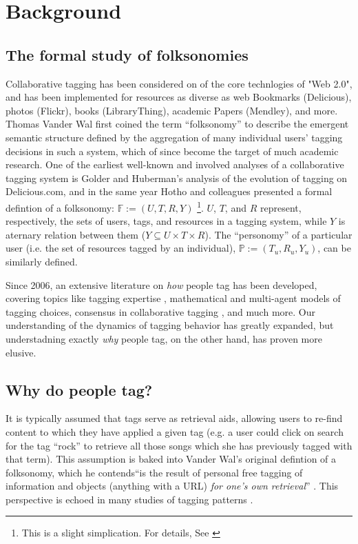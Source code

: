 \section{Background}
\label{sec_related}

\subsection{The formal study of folksonomies}
Collaborative tagging has been considered on of the core technlogies of "Web 2.0", and has been implemented for resources as diverse as web Bookmarks (Delicious), photos (Flickr), books (LibraryThing), academic Papers (Mendley), and more. Thomas Vander Wal \cite{VanderWal2007} first coined the term ``folksonomy'' to describe the emergent semantic structure defined by the aggregation of many individual users' tagging decisions in such a system, which of since become the target of much academic research. One of the earliest well-known and involved analyses of a collaborative tagging system is Golder and Huberman's \cite{Golder2006} analysis of the evolution of tagging on Delicious.com, and in the same year Hotho and colleagues \cite{Hotho2006a} presented a formal defintion of a folksonomy: $\mathbb{F} := (U,T,R,Y)$ \footnote{This is a slight simplication. For details, See \cite{Hotho2006a}}. $U$, $T$, and $R$ represent, respectively, the sets of users, tags, and resources in a tagging system, while $Y$ is  aternary relation between them ($Y \subseteq U \times T \times R$). The ``personomy'' of a particular user (i.e. the set of resources tagged by an individual),  $\mathbb{P} := (T_{u},R_{u},Y_{u})$, can be similarly defined.

Since 2006, an extensive literature on \emph{how} people tag has been developed, covering topics like tagging expertise \cite{Yeung2009,Yeung2011},	mathematical \cite{Cattuto2007a} and multi-agent \cite{Lorince2013} models of tagging choices, consensus in collaborative tagging \cite{Halpin2007,Robu2009}, and much more. Our understanding of the dynamics of tagging behavior has greatly expanded, but understadning exactly \emph{why} people tag, on the other hand, has proven more elusive.

\subsection{Why do people tag?}
It is typically assumed that tags serve as retrieval aids, allowing users to re-find content to which they have applied a given tag (e.g. a user could click on search for the tag ``rock'' to retrieve all those songs which she has previously tagged with that term). This assumption is baked into Vander Wal's original defintion of a folksonomy, which he contends``is the result of personal free tagging of information and objects (anything with a URL) \emph{for one's own retrieval}'' \cite[emphasis added]{VanderWal2007}. This perspective is echoed in many studies of tagging patterns \cite{Glushko2008,Halpin2007,Golder2006}.

